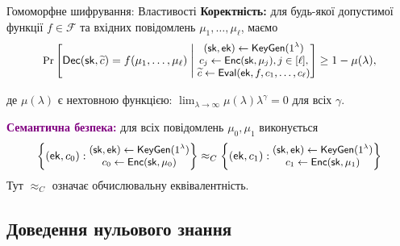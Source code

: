 \documentclass{zkdl-presentation-template}
\begin{document}
    \begin{frame}{Гомоморфне шифрування: Властивості}
        \textcolor{blue!80!black}{\textbf{Коректність:}} для будь-якої
        допустимої функції $f \in \mathcal{F}$ та вхідних повідомлень
        $\mu_1,\dots,\mu_{\ell}$, маємо
        \begin{equation*}
            \small\text{Pr}\left[ \mathsf{Dec}(\mathsf{sk},\widetilde{c}) = f(\mu_1,\dots,\mu_{\ell}) \; \middle| \; \begin{matrix}
                (\mathsf{sk},\mathsf{ek}) \gets \mathsf{KeyGen}(1^{\lambda}) \\
                c_j \gets \mathsf{Enc}(\mathsf{sk},\mu_j), j \in [\ell], \\
                \widetilde{c} \gets \mathsf{Eval}(\mathsf{ek},f,c_1,\dots,c_{\ell})
            \end{matrix} \right] \geq 1 - \mu(\lambda),
        \end{equation*}

        де $\mu(\lambda)$ є нехтовною функцією: $\lim_{\lambda \to
        \infty}\mu(\lambda)\lambda^{\gamma} = 0$ для всіх $\gamma$.

        \textcolor{purple}{\textbf{Семантична безпека:}} для всіх повідомлень
        $\mu_0,\mu_1$ виконується
        \begin{equation*}
            \small\left\{ (\mathsf{ek},c_0): \begin{matrix}
                (\mathsf{sk},\mathsf{ek}) \gets \mathsf{KeyGen}(1^{\lambda}) \\
                c_0 \gets \mathsf{Enc}(\mathsf{sk},\mu_0)
            \end{matrix} \right\} \approx_C \left\{ (\mathsf{ek},c_1): \begin{matrix}
                (\mathsf{sk},\mathsf{ek}) \gets \mathsf{KeyGen}(1^{\lambda}) \\
                c_1 \gets \mathsf{Enc}(\mathsf{sk},\mu_1)
            \end{matrix} \right\}
        \end{equation*}
        Тут $\approx_C$ означає обчислювальну еквівалентність.

    \end{frame}

    \subsection{Доведення нульового знання}
\end{document}
